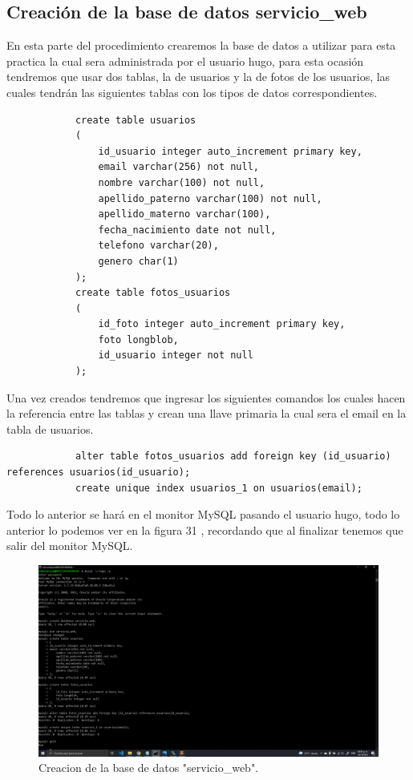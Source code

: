 \documentclass[11pt]{article}
\begin{document}
		\subsection{Creación de la base de datos servicio\_web}
		En esta parte del procedimiento crearemos la base de datos a utilizar para esta practica la cual sera administrada por el usuario hugo, para esta ocasión tendremos que usar dos tablas, la de usuarios y la de fotos de los usuarios, las cuales tendrán las siguientes tablas con los tipos de datos correspondientes.
		\begin{verbatim}
			create table usuarios
			(
			    id_usuario integer auto_increment primary key,
			    email varchar(256) not null,
			    nombre varchar(100) not null,
			    apellido_paterno varchar(100) not null,
			    apellido_materno varchar(100),
			    fecha_nacimiento date not null,
			    telefono varchar(20),
			    genero char(1)
			);
			create table fotos_usuarios
			(
			    id_foto integer auto_increment primary key,
			    foto longblob,
			    id_usuario integer not null
			);
		\end{verbatim}
		Una vez creados tendremos que ingresar los siguientes comandos los cuales hacen la referencia entre las tablas y crean una llave primaria la cual sera el email en la tabla de usuarios.
		\begin{verbatim}
			alter table fotos_usuarios add foreign key (id_usuario) references usuarios(id_usuario);
			create unique index usuarios_1 on usuarios(email);
		\end{verbatim}
		Todo lo anterior se hará en el monitor MySQL pasando el usuario hugo, todo lo anterior lo podemos ver en la figura 31 , recordando que al finalizar tenemos que salir del monitor MySQL.
		\begin{figure}[H]
			\centering
			\includegraphics[scale=0.34]{resources/bdok.png}
			\caption{Creacion de la base de datos "servicio\_web".}\label{fig:picture}
		\end{figure}
\end{document}
